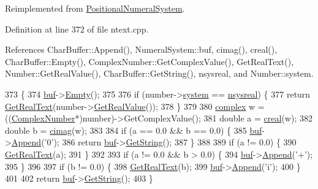 Reimplemented from \hyperlink{classPositionalNumeralSystem_ac4acbb807861e8ff702d9624fb5db87d}{Positional\+Numeral\+System}.



Definition at line 372 of file ntext.\+cpp.



References Char\+Buffer\+::\+Append(), Numeral\+System\+::buf, cimag(), creal(), Char\+Buffer\+::\+Empty(), Complex\+Number\+::\+Get\+Complex\+Value(), Get\+Real\+Text(), Number\+::\+Get\+Real\+Value(), Char\+Buffer\+::\+Get\+String(), nsysreal, and Number\+::system.


\begin{DoxyCode}
373 \{
374     \hyperlink{classNumeralSystem_a03e7be944bf3fa5e4c34d80f135cd017}{buf}->\hyperlink{classCharBuffer_abe39d3fd7d8b9c8ec343af2cae7adc96}{Empty}();
375 
376     \textcolor{keywordflow}{if} (number->\hyperlink{structNumber_a2ceda5601c42288626e76b06878e7476}{system} == \hyperlink{numb_8h_a1475a201d2346881ce88dfbacf628c7dae72cf8673109b15268d1c0837e8bff86}{nsysreal}) \{
377         \textcolor{keywordflow}{return} \hyperlink{classDecimalSystem_a7b3744c834e092220ab3c2b7ed8eee47}{GetRealText}(number->\hyperlink{structNumber_a83da654d465f1344162ce8b8f8c564b9}{GetRealValue}());
378     \}
379 
380     \hyperlink{unioncomplex}{complex} w = ((\hyperlink{structComplexNumber}{ComplexNumber}*)number)->GetComplexValue();
381     \textcolor{keywordtype}{double} a = \hyperlink{complex_8h_a4a236b24c0197821e3489a35a72079ab}{creal}(w);
382     \textcolor{keywordtype}{double} b = \hyperlink{complex_8h_aa1fe0b9371befabef6c41ba73470774a}{cimag}(w);
383 
384     \textcolor{keywordflow}{if} (a == 0.0 && b == 0.0) \{
385         \hyperlink{classNumeralSystem_a03e7be944bf3fa5e4c34d80f135cd017}{buf}->\hyperlink{classCharBuffer_a045b38735f7b3007c1b98d3d7b7feafe}{Append}(\textcolor{charliteral}{'0'});
386         \textcolor{keywordflow}{return} \hyperlink{classNumeralSystem_a03e7be944bf3fa5e4c34d80f135cd017}{buf}->\hyperlink{classCharBuffer_a7dfd3feaaf80f318ba44efe15b1ec44b}{GetString}();
387     \}
388 
389     \textcolor{keywordflow}{if} (a != 0.0) \{
390         \hyperlink{classDecimalSystem_a7b3744c834e092220ab3c2b7ed8eee47}{GetRealText}(a);
391     \}
392 
393     \textcolor{keywordflow}{if} (a != 0.0 && b > 0.0) \{
394         \hyperlink{classNumeralSystem_a03e7be944bf3fa5e4c34d80f135cd017}{buf}->\hyperlink{classCharBuffer_a045b38735f7b3007c1b98d3d7b7feafe}{Append}(\textcolor{charliteral}{'+'});
395     \}
396 
397     \textcolor{keywordflow}{if} (b != 0.0) \{
398         \hyperlink{classDecimalSystem_a7b3744c834e092220ab3c2b7ed8eee47}{GetRealText}(b);
399         \hyperlink{classNumeralSystem_a03e7be944bf3fa5e4c34d80f135cd017}{buf}->\hyperlink{classCharBuffer_a045b38735f7b3007c1b98d3d7b7feafe}{Append}(\textcolor{charliteral}{'i'});
400     \}
401 
402     \textcolor{keywordflow}{return} \hyperlink{classNumeralSystem_a03e7be944bf3fa5e4c34d80f135cd017}{buf}->\hyperlink{classCharBuffer_a7dfd3feaaf80f318ba44efe15b1ec44b}{GetString}();
403 \}
\end{DoxyCode}


